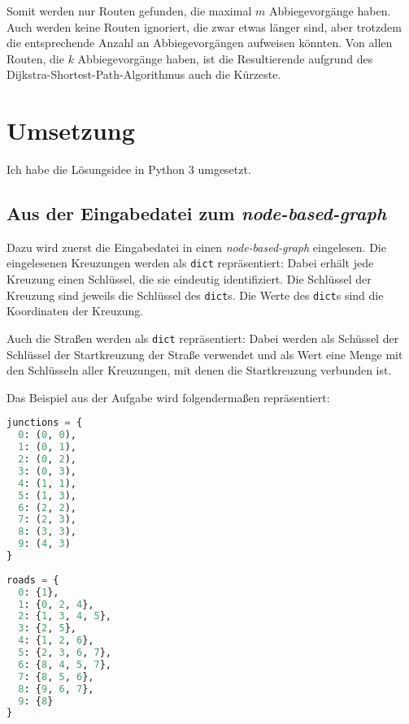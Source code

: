\documentclass[a4paper,10pt,ngerman]{scrartcl}
\begin{document}
Somit werden nur Routen gefunden, die maximal $m$ Abbiegevorgänge haben.
Auch werden keine Routen ignoriert, die zwar etwas länger sind, aber trotzdem die entsprechende Anzahl an Abbiegevorgängen aufweisen könnten.
Von allen Routen, die $k$ Abbiegevorgänge haben, ist die Resultierende aufgrund des Dijkstra-Shortest-Path-Algorithmus auch die Kürzeste.

\section{Umsetzung}

Ich habe die Lösungsidee in Python 3 umgesetzt.

\subsection{Aus der Eingabedatei zum \textit{node-based-graph}}

Dazu wird zuerst die Eingabedatei in einen \textit{node-based-graph} eingelesen.
Die eingelesenen Kreuzungen werden als \texttt{dict} repräsentiert: Dabei erhält jede Kreuzung einen Schlüssel, die sie eindeutig identifiziert.
Die Schlüssel der Kreuzung sind jeweils die Schlüssel des \texttt{dict}s.
Die Werte des \texttt{dict}s sind die Koordinaten der Kreuzung.

Auch die Straßen werden als \texttt{dict} repräsentiert: Dabei werden als Schüssel der Schlüssel der Startkreuzung der Straße verwendet und als Wert eine Menge mit den Schlüsseln aller Kreuzungen, mit denen die Startkreuzung verbunden ist.

Das Beispiel aus der Aufgabe wird folgendermaßen repräsentiert:

\begin{lstlisting}[language=Python]
junctions = {
  0: (0, 0), 
  1: (0, 1), 
  2: (0, 2), 
  3: (0, 3), 
  4: (1, 1), 
  5: (1, 3), 
  6: (2, 2), 
  7: (2, 3), 
  8: (3, 3), 
  9: (4, 3)
} 
 
roads = {
  0: {1}, 
  1: {0, 2, 4}, 
  2: {1, 3, 4, 5}, 
  3: {2, 5}, 
  4: {1, 2, 6}, 
  5: {2, 3, 6, 7}, 
  6: {8, 4, 5, 7}, 
  7: {8, 5, 6}, 
  8: {9, 6, 7}, 
  9: {8}
}
\end{lstlisting}
\end{document}
